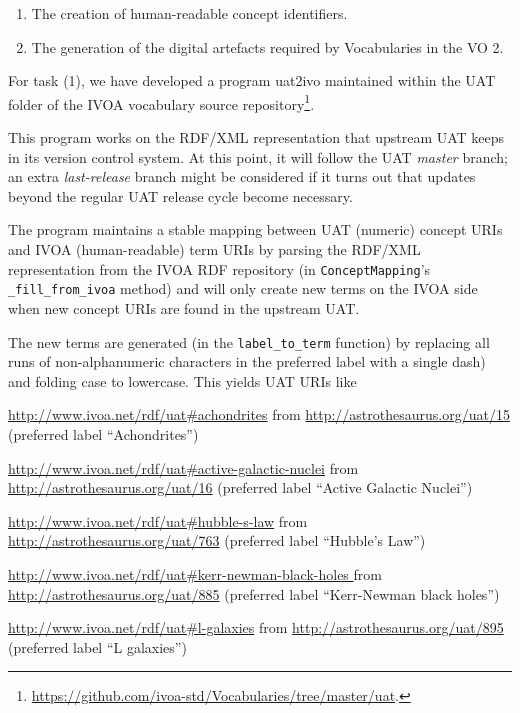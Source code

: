 \documentclass[11pt,a4paper]{ivoa}
\begin{document}
\begin{enumerate}
\item The creation of human-readable concept identifiers.
\item The generation of the digital artefacts required by Vocabularies
in the VO 2.
\end{enumerate}

For task (1), we have developed a program uat2ivo maintained within
the UAT folder of the IVOA vocabulary source 
repository\footnote{\url{https://github.com/ivoa-std/Vocabularies/tree/master/uat}.}.

This program works on the RDF/XML representation that upstream UAT
keeps in its version control system.  At this point, it will follow the
UAT \emph{master} branch; an extra \emph{last-release} branch might be
considered if it turns out that updates beyond the regular UAT release
cycle become necessary.

The program maintains a stable mapping between UAT (numeric) concept
URIs and IVOA (human-readable) term URIs by parsing the RDF/XML
representation from the IVOA RDF repository (in \verb|ConceptMapping|'s
\verb|_fill_from_ivoa| method) and will only create new terms on the
IVOA side when new concept URIs are found in the upstream UAT.

The new terms are generated (in the \verb|label_to_term| function) by
replacing all runs of non-alphanumeric characters in the preferred label
with a single dash) and folding case to lowercase.  This yields UAT URIs
like

\begin{bigdescription}
\item[\url{http://www.ivoa.net/rdf/uat#achondrites}] from
\url{http://astrothesaurus.org/uat/15} (preferred label ``Achondrites'')
\item[\url{http://www.ivoa.net/rdf/uat#active-galactic-nuclei}]
from \url{http://astrothesaurus.org/uat/16} (preferred label ``Active
Galactic Nuclei'')
\item[\url{http://www.ivoa.net/rdf/uat#hubble-s-law}]
from \url{http://astrothesaurus.org/uat/763} (preferred label ``Hubble's
Law'')
\item[\url{http://www.ivoa.net/rdf/uat#kerr-newman-black-holes }]
from \url{http://astrothesaurus.org/uat/885} (preferred label
``Kerr-Newman black holes'')
\item[\url{http://www.ivoa.net/rdf/uat#l-galaxies}] from
\url{http://astrothesaurus.org/uat/895} (preferred label ``L galaxies'')
\end{bigdescription}
\end{document}
